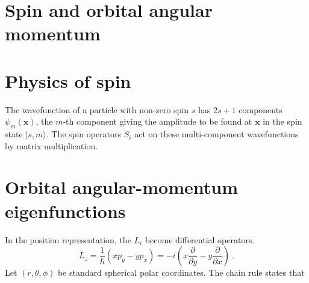 \documentclass[12pt,a4paper]{article}
\renewcommand{\vec}[1]{\boldsymbol{#1}}
\begin{document}
\section{Spin and orbital angular momentum}
\cite{binney2013physics} 






























\section{Physics of spin}
\cite{binney2013physics} The wavefunction of a particle with non-zero spin $s$ has $2s+1$ components $\psi_m(\vec{x})$, the $m$-th component giving the amplitude to be found at $\vec{x}$ in the spin state $|s, m\rangle$. The spin operators $S_i$ act on these multi-component wavefunctions by matrix multiplication.



























\section{Orbital angular-momentum eigenfunctions}
\cite{binney2013physics} In the position representation, the $L_i$ become differential operators.
\begin{equation}
L_z = \dfrac{1}{\hbar} (xp_y - yp_x) = -i \left(x \dfrac{\partial }{\partial y} -y \dfrac{\partial }{\partial x}  \right) ~.
\end{equation}
Let $(r, \theta, \phi)$ be standard spherical polar coordinates. The chain rule states that
\begin{equation}

\end{equation}
\end{document}
